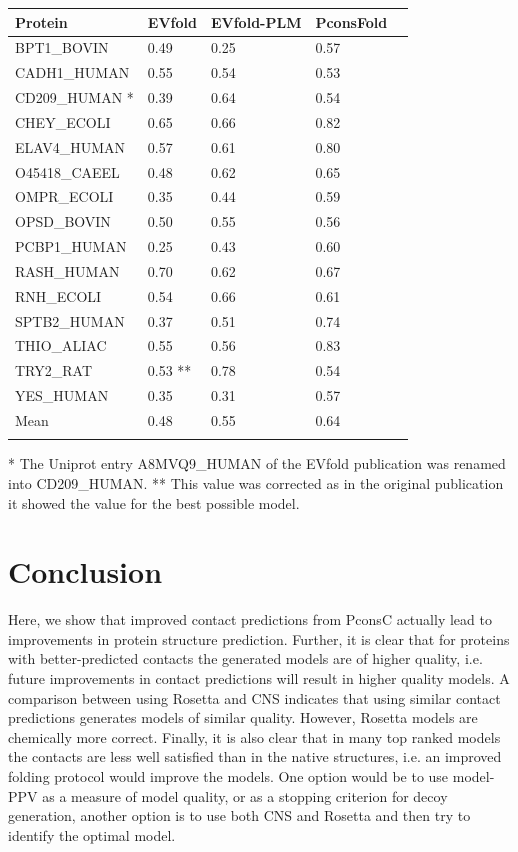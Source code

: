 \documentclass{bioinfo}
\begin{document}
\begin{table}[!t]
{\begin{tabular}{lp{1.5cm}p{1.5cm}p{1.5cm}p{1.5cm}}\toprule
Protein & EVfold  & EVfold-PLM  & PconsFold\\\midrule
BPT1\_BOVIN & 0.49 & 0.25  & 0.57 \\
CADH1\_HUMAN & 0.55 & 0.54  & 0.53 \\
CD209\_HUMAN * & 0.39 & 0.64  & 0.54 \\
CHEY\_ECOLI & 0.65 & 0.66  & 0.82 \\
ELAV4\_HUMAN & 0.57 & 0.61  & 0.80 \\
O45418\_CAEEL & 0.48 & 0.62  & 0.65 \\
OMPR\_ECOLI & 0.35 & 0.44  & 0.59 \\
OPSD\_BOVIN & 0.50 & 0.55  & 0.56 \\
PCBP1\_HUMAN & 0.25 & 0.43  & 0.60 \\
RASH\_HUMAN & 0.70 & 0.62  & 0.67 \\
RNH\_ECOLI & 0.54 & 0.66  & 0.61 \\
SPTB2\_HUMAN & 0.37 & 0.51 & 0.74 \\
THIO\_ALIAC & 0.55 & 0.56  & 0.83 \\
TRY2\_RAT & 0.53 ** & 0.78  & 0.54 \\
YES\_HUMAN & 0.35 & 0.31  & 0.57 \\ \midrule
Mean & 0.48 & 0.55  & 0.64 \\ \botrule
\end{tabular}}{* The Uniprot entry A8MVQ9\_HUMAN of the EVfold publication was renamed into CD209\_HUMAN. ** This value was corrected as in the original publication it showed the value for the best possible model.}
\end{table}


\section{Conclusion}

Here, we show that improved contact predictions from PconsC
\cite[]{skwark_PconsC:_2013} actually lead to improvements in protein
structure prediction. Further, it is clear that for proteins with
better-predicted contacts the generated models are of higher quality,
i.e. future improvements in contact predictions will result in higher
quality models. A comparison between using Rosetta and CNS indicates
that using similar contact predictions generates models of similar
quality. However, Rosetta models are chemically more correct. Finally,
it is also clear that in many top ranked models the contacts are less
well satisfied than in the native structures, i.e. an improved folding
protocol would improve the models. One option would be to use
model-PPV as a measure of model quality, or as a stopping criterion
for decoy generation, another option is to use both CNS and Rosetta
and then try to identify the optimal model.
\end{document}
